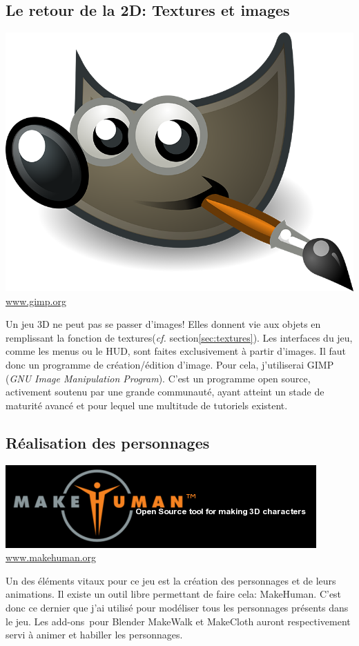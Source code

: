 \subsection{Le retour de la 2D: Textures et images}
\begin{center}
	\includegraphics[width=.2\textwidth]{images/Technique/gimp.png}
	\\\url{www.gimp.org}
\end{center}

Un jeu 3D ne peut pas se passer d'images! Elles donnent vie aux objets en remplissant la fonction de textures (\textit{cf.} section\ref{sec:textures}). Les interfaces du jeu, comme les menus ou le HUD, sont faites exclusivement à partir d'images. Il faut donc un programme de création/édition d'image. Pour cela, j'utiliserai GIMP (\textit{GNU Image Manipulation Program}). C'est un programme open source, activement soutenu par une grande communauté, ayant atteint un stade de maturité avancé et pour lequel une multitude de tutoriels existent.



\subsection{Réalisation des personnages}
\begin{center}
	\includegraphics[width=.5\textwidth]{images/Technique/makeHuman.png}
	\\\url{www.makehuman.org}
\end{center}

Un des éléments vitaux pour ce jeu est la création des personnages et de leurs animations. Il existe un outil libre permettant de faire cela: MakeHuman. C'est donc ce dernier que j'ai utilisé pour modéliser tous les personnages présents dans le jeu. Les add-ons\ pour Blender MakeWalk et MakeCloth auront respectivement servi à animer et habiller les personnages.



